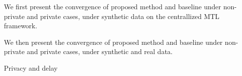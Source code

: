 
We first present the convergence of proposed method and baseline under non-private and private cases, under synthetic data on the centrallized MTL framework.

We then present the convergence of proposed method and baseline under non-private and private cases, under synthetic and real data.

Privacy and delay